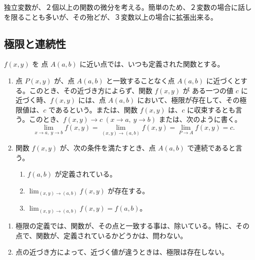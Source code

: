 \newcommand{\nroot}[2]{{}^{#1}\!\!\!\sqrt{#2}}

\def\inkern{\mathchoice{\!\!\!}{\!\!}{\!\!}{\!\!}}
\def\iint{\int\inkern\int} %
\def\iiint{\int\inkern\int\inkern\int} %


\maketitle
{}
独立変数が、２個以上の関数の微分を考える。簡単のため、２変数の場合に話しを限ることも多いが、その殆どが、３変数以上の場合に拡張出来る。

\subsection{極限と連続性}
\begin{definition}
$f(x,y)$ を 点 $A(a,b)$ に近い点では、いつも定義された関数とする。
\begin{enumerate}
\item 点 $P(x,y)$ が、点 $A(a,b)$ と一致することなく点 $A(a,b)$ に近づくとする。このとき、その近づき方によらず、関数 $f(x,y)$ が ある一つの値 $c$ に近づく時、$f(x,y)$ には、点 $A(a,b)$ において、極限が存在して、その極限値は、$c$  であるという。または、関数 $f(x,y)$ は、$c$ に収束するとも言う。このとき、$f(x,y) \to c\;(x\to a, \:y\to b)$ または、次のように書く。
$$\lim_{x\to a,\:y\to b}f(x,y) = \lim_{(x,y)\to(a,b)}f(x,y) = \lim_{P\to A}f(x,y) = c.$$
\item 関数 $f(x,y)$ が、次の条件を満たすとき、点 $A(a,b)$ で連続であると言う。
	\begin{enumerate}
	\item $f(a,b)$ が定義されている。
	\item $\lim_{(x,y)\to(a,b)}f(x,y)$ が存在する。
	\item $\lim_{(x,y)\to(a,b)}f(x,y) = f(a,b)$。
	\end{enumerate}
\end{enumerate}
\end{definition}

\note
\begin{enumerate}
\item 極限の定義では、関数が、その点と一致する事は、除いている。特に、その点で、関数が、定義されているかどうかは、問わない。
\item 点の近づき方によって、近づく値が違うときは、極限は存在しない。
\end{enumerate}

